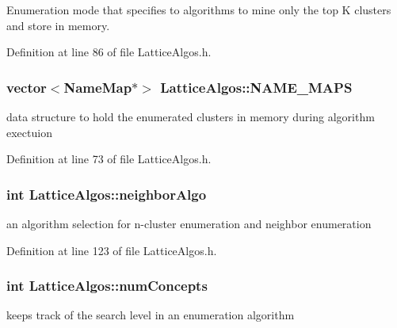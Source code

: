 Enumeration mode that specifies to algorithms to mine only the top K clusters and store in memory. 



Definition at line 86 of file LatticeAlgos.h.

\hypertarget{class_lattice_algos_a242b1f9b2ec58cec08c4c5c074c0c1e7}{
\subsubsection[{NAME\_\-MAPS}]{\setlength{\rightskip}{0pt plus 5cm}vector$<${\bf NameMap}$\ast$$>$ {\bf LatticeAlgos::NAME\_\-MAPS}}}
\label{class_lattice_algos_a242b1f9b2ec58cec08c4c5c074c0c1e7}


data structure to hold the enumerated clusters in memory during algorithm exectuion 



Definition at line 73 of file LatticeAlgos.h.

\hypertarget{class_lattice_algos_a2f00781816c66a03204d5e74010375e1}{
\subsubsection[{neighborAlgo}]{\setlength{\rightskip}{0pt plus 5cm}int {\bf LatticeAlgos::neighborAlgo}}}
\label{class_lattice_algos_a2f00781816c66a03204d5e74010375e1}


an algorithm selection for n-\/cluster enumeration and neighbor enumeration 



Definition at line 123 of file LatticeAlgos.h.

\hypertarget{class_lattice_algos_a8a6e4d766e7f93a288e015e93b3183a0}{
\subsubsection[{numConcepts}]{\setlength{\rightskip}{0pt plus 5cm}int {\bf LatticeAlgos::numConcepts}}}
\label{class_lattice_algos_a8a6e4d766e7f93a288e015e93b3183a0}


keeps track of the search level in an enumeration algorithm 



